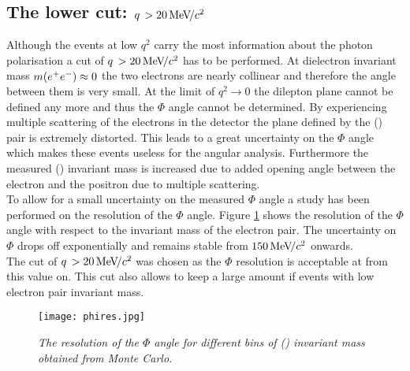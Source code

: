 \subsection{The lower cut: $q\, > 20{\mathrm{\,Me\kern -0.1em V\!/}c^2}$}
Although the \BdKstee events at low $q^2$ carry the most information about the photon polarisation a cut of $q\, > 20{\mathrm{\,Me\kern -0.1em V\!/}c^2}$ has to be performed. At dielectron invariant mass $m(e^+e^-)\approx 0$ the two electrons are nearly collinear and therefore the angle between them is very small. At the limit of $q^2 \rightarrow 0$ the dilepton plane cannot be defined any more and thus the $\Phi$ angle cannot be determined. By experiencing multiple scattering of the electrons in the detector the plane defined by the (\epem) pair is extremely distorted. This leads to a great uncertainty on the $\Phi$ angle which makes these events useless for the angular analysis. Furthermore the measured (\epem) invariant mass is increased due to added opening angle between the electron and the positron due to multiple scattering. \\
To allow for a small uncertainty on the measured $\Phi$ angle a study has been performed on the resolution of the $\Phi$ angle. Figure \ref{fig:phires} shows the resolution of the $\Phi$ angle with respect to the invariant mass of the electron pair. The uncertainty on $\Phi$ drops off exponentially and remains stable from $150 {\mathrm{\,Me\kern -0.1em V\!/}c^2}$ onwards.\\
The cut of $q\, > 20{\mathrm{\,Me\kern -0.1em V\!/}c^2}$ was chosen as the $\Phi$ resolution is acceptable at from this value on. This cut also allows to keep a large amount if events with low electron pair invariant mass.
\begin{figure}[ht]
\vspace{-0.4cm}
  \begin{center}
\texttt{[image: phires.jpg]}
  \vspace*{-0.8cm}
  \end{center}
  \caption{\textit{The resolution of the $\Phi$ angle for different bins of (\epem) invariant mass obtained from \BdKstee Monte Carlo.}}
  \label{fig:phires}
\end{figure}